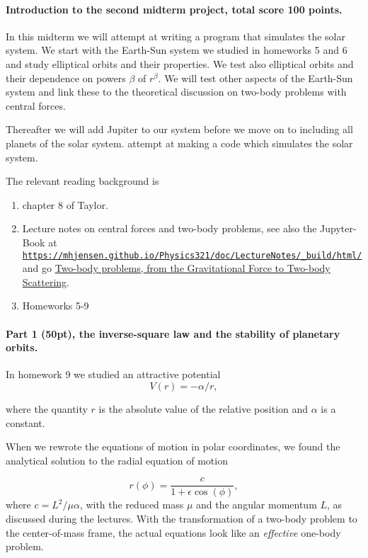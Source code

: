 \documentclass[%
oneside,                 %
final,                   %
10pt]{article}
\begin{document}
\noindent
\paragraph{Introduction to the second midterm project, total score 100 points.}
In this midterm we will attempt at writing a program that simulates
the solar system. We start with the Earth-Sun system we studied in
homeworks 5 and 6 and study elliptical orbits and their properties. We test
also elliptical orbits and their dependence on powers $\beta$ of
$r^{\beta}$. We will test other aspects of the Earth-Sun system and
link these to the theoretical discussion on two-body problems with
central forces. 

Thereafter we will add Jupiter to our system before we move on to including all planets of the solar system.
attempt at making a code which simulates the solar system.

The relevant reading background is
\begin{enumerate}
\item chapter 8 of  Taylor.

\item Lecture notes on central forces and two-body problems, see also the Jupyter-Book at \href{{https://mhjensen.github.io/Physics321/doc/LectureNotes/_build/html/}}{\nolinkurl{https://mhjensen.github.io/Physics321/doc/LectureNotes/_build/html/}} and go \href{{https://mhjensen.github.io/Physics321/doc/LectureNotes/_build/html/chapter6.html}}{Two-body problems, from the Gravitational Force to Two-body Scattering}.

\item Homeworks 5-9
\end{enumerate}

\noindent
\paragraph{Part 1 (50pt), the inverse-square law and the stability of planetary orbits.}
In homework 9 we studied an attractive potential
\[
V(r)=-\alpha/r,
\]

where the quantity $r$ is the absolute value of the relative position
and $\alpha$ is a constant.


When we rewrote the equations of motion in polar coordinates, we found the
analytical solution to the radial equation of motion 

\[
r(\phi) = \frac{c}{1+\epsilon\cos{(\phi)}},
\]
where $c=L^2/\mu\alpha$, with
the reduced mass $\mu$ and the angular momentum $L$, as
discussed during the lectures. With the transformation of a two-body
problem to the center-of-mass frame, the actual equations look like an
\emph{effective} one-body problem. 
\end{document}
